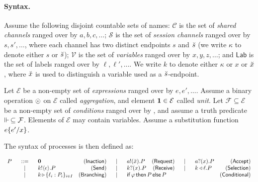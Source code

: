\paragraph{Syntax.}
\label{subsec:syntax}
%
Assume the following disjoint countable sets of names: $\mathcal C$ is the set of \emph{shared channels} ranged over by $a,b,c,\dots$; $\mathcal S$ is the set of \emph{session channels} ranged over by $s,s',\dots$, where each channel has two distinct endpoints $s$ and $\breve{s}$
(we write $\kappa$ to denote either $s$ or $\breve{s}$);
$\mathcal V$ is the set of \emph{variables} ranged
over by $x,y,z,\dots$;
and $\mathsf{Lab}$ is the set of labels ranged over
by $\ell, \ell', \dots$.
%
We write $k$ to denote either $\kappa$ or $x$ or $\breve{x}$,
where $\breve{x}$ is used to distinguish a variable used as a
$\breve{s}$-endpoint.

Let $\mathcal E$ be a non-empty set of {\em expressions}
ranged over by $e,e',\dots$. Assume a binary operation
$\odot$ on $\mathcal E$ called {\em aggregation},
and element $\mathbf{1} \in \mathcal E$ called {\em unit}.
%
Let $\mathcal F \subseteq \mathcal E$ be a non-empty set
of {\em conditions} ranged over by \econd, and assume a
truth predicate $\Vdash\, \subseteq \mathcal F$.
%
Elements of $\mathcal E$ %
may contain variables.
%
Assume a substitution function $e \{{e'}/{x}\}$.
%

The syntax of processes is then defined as:

%
\noindent
$
	\begin{array}{rclrclrclr}
		P &\bnfis& \nil & \Inact &\bnfbar& \request{a}{\aggr x} P & \Request &\bnfbar& \accept{a}{x}{P} & \Accept
		\\
		&\bnfbar& \pout{k}{e} P & \Send &\bnfbar& \pin{k}{x} P & \Rcv %
		& \bnfbar & \sel{k}{\ell} P & \Selection
		\\
		&\bnfbar& \branch{k}{\ell_i: P_i}_{i \in I} & \Branching %
		& \bnfbar & \multicolumn{4}{l}{\cond{\econd}{P}{P}} & \Conditional
	\end{array}
$

